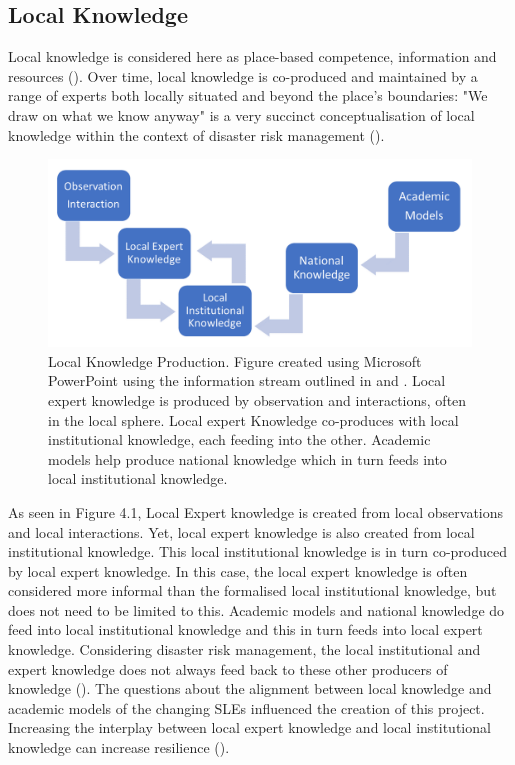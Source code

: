 \subsection{Local Knowledge}

Local knowledge is considered here as place-based competence, information and resources (\cite{setten_we_2019}). Over time,  local knowledge is co-produced and maintained by a range of experts both locally situated and beyond the place's boundaries: "We draw on what we know anyway" is a very succinct conceptualisation of local knowledge within the context of disaster risk management (\cite{setten_we_2019}). 

\begin{figure}[h]
    \centering
    \includegraphics[width=1\textwidth]{fig_theory/local knowledge accumulation.png}
    \caption{Local Knowledge Production. Figure created using Microsoft PowerPoint using the information stream outlined in \cite{setten_we_2019} and \cite{rod_integrated_2012}. Local expert knowledge is produced by observation and interactions, often in the local sphere. Local expert Knowledge co-produces with local institutional knowledge, each feeding into the other. Academic models help produce national knowledge which in turn feeds into local institutional knowledge.}
    \label{fig:local_knowledge}
\end{figure}


As seen in Figure 4.1, Local Expert knowledge is created from local observations and local interactions. Yet, local expert knowledge is also created from local institutional knowledge. This local institutional knowledge is in turn co-produced by local expert knowledge. In this case, the local expert knowledge is often considered more informal than the formalised local institutional knowledge, but does not need to be limited to this.  Academic models and national knowledge do feed into local institutional knowledge and this in turn feeds into local expert knowledge. Considering disaster risk management, the local institutional and expert knowledge does not always feed back to these other producers of knowledge (\cite{rod_integrated_2012}). The questions about the alignment between local knowledge and academic models of the changing SLEs influenced the creation of this project. Increasing the interplay between local expert knowledge and local institutional knowledge can increase resilience (\cite{setten_we_2019}).

